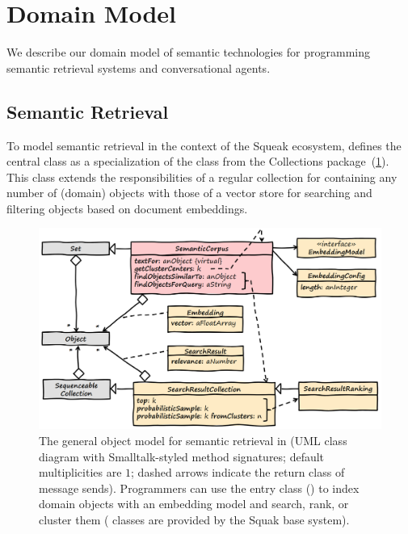 
\section{Domain Model}
\label{sec:semtex/model}

We describe our domain model of semantic technologies for programming semantic retrieval systems and conversational agents.

\subsection*{Semantic Retrieval}
\label{sec:semtex/model/retrieval}

To model semantic retrieval in the context of the Squeak ecosystem, \semtex defines the central class  as a specialization of the  class from the Collections package~(\cref{fig:semtex/model/search}).
This class extends the responsibilities of a regular collection for containing any number of (domain) objects with those of a vector store for searching and filtering objects based on document embeddings.

\begin{figure}
	\centering
	\includegraphics[width=\textwidth]{01_model/search.png}
	\caption[The object model for semantic retrieval in \semtex.]{
		The general object model for semantic retrieval in \semtex (UML class diagram with Smalltalk-styled method signatures; default multiplicities are $1$; dashed arrows indicate the return class of message sends).
		Programmers can use the entry class  (\bold{\textcolor[HTML]{c00000}{red}}) to index domain objects with an embedding model and search, rank, or cluster them (\bold{\textcolor{gray}{gray}} classes are provided by the Squak base system).
	}
	\label{fig:semtex/model/search}
\end{figure}

